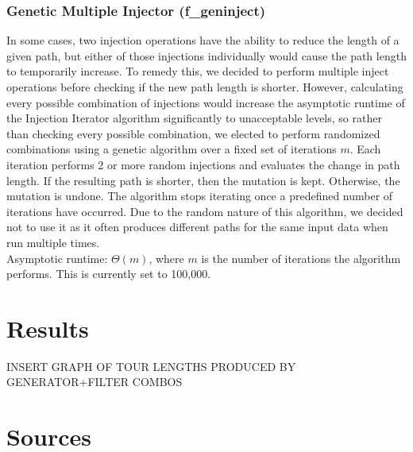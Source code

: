 \documentclass{article}
\begin{document}
\section*{Genetic Multiple Injector (f\_geninject)}

In some cases, two injection operations have the ability to reduce the length
of a given path, but either of those injections individually would cause the
path length to temporarily increase. To remedy this, we decided to perform
multiple inject operations before checking if the new path length is shorter.
However, calculating every possible combination of injections would increase
the asymptotic runtime of the Injection Iterator algorithm significantly to
unacceptable levels, so rather than checking every possible combination, we
elected to perform randomized combinations using a genetic algorithm over a
fixed set of iterations $m$. Each iteration performs 2 or more random
injections and evaluates the change in path length. If the resulting path is
shorter, then the mutation is kept. Otherwise, the mutation is undone. The
algorithm stops iterating once a predefined number of iterations have occurred.
Due to the random nature of this algorithm, we decided not to use it as it
often produces different paths for the same input data when run multiple
times.\\Asymptotic runtime: $\Theta (m)$, where $m$ is the number of iterations
the algorithm performs. This is currently set to 100,000.

\part*{Results}

INSERT GRAPH OF TOUR LENGTHS PRODUCED BY GENERATOR+FILTER COMBOS

\part*{Sources}
\end{document}
